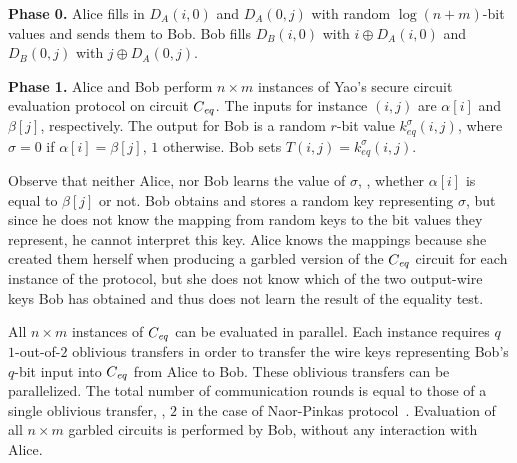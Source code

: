 

\vspace{1ex}
\noindent
\textbf{Phase 0.}
Alice fills in $D_A(i,0)$ and $D_A(0,j)$ with random $\log(n+m)$-bit
values and sends them to Bob.  Bob fills $D_B(i,0)$ with $i \oplus D_A(i,0)$
and $D_B(0,j)$ with $j \oplus D_A(0,j)$.

\vspace{1ex}
\noindent
\textbf{Phase 1.}
Alice and Bob perform $n \times m$ instances of Yao's secure circuit
evaluation protocol on circuit $C_{\mathit{eq}}$.  The inputs for instance $(i,j)$
are $\alpha[i]$ and $\beta[j]$, respectively.  The output for Bob is a
random $r$-bit value $k^{\sigma}_{eq} (i,j)$, where $\sigma=0$ if
$\alpha[i]=\beta[j]$, $1$ otherwise.  Bob sets $T(i,j)=k^{\sigma}_{eq} (i,j)$.

Observe that neither Alice, nor Bob learns the value of $\sigma$, \ie,
whether $\alpha[i]$ is equal to $\beta[j]$ or not.  Bob obtains and stores
a random key representing $\sigma$, but since he does not know the mapping
from random keys to the bit values they represent, he cannot interpret
this key.  Alice knows the mappings because she created them herself
when producing a garbled version of the $C_{\mathit{eq}}$ circuit for each instance
of the protocol, but she does not know which of the two output-wire keys
Bob has obtained and thus does not learn the result of the equality test.

All $n \times m$ instances of $C_{\mathit{eq}}$ can be evaluated in parallel.
Each instance requires $q$ $1$-out-of-$2$ oblivious transfers in order
to transfer the wire keys representing Bob's $q$-bit input into $C_{\mathit{eq}}$
from Alice to Bob.  These oblivious transfers can
be parallelized.  The total number of communication rounds is equal to
those of a single oblivious transfer, \eg, $2$ in the case of Naor-Pinkas
protocol~\cite{Naor-Pinkas:2001}.  Evaluation of all $n \times m$
garbled circuits is performed by Bob, without any interaction with Alice.


